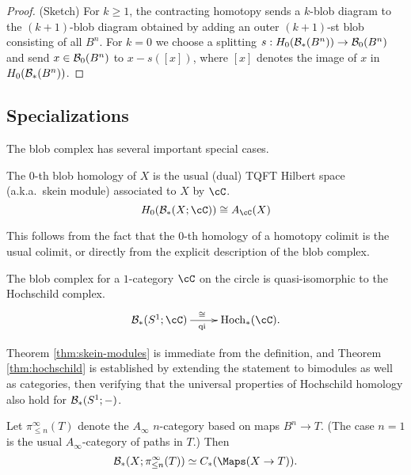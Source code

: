 \documentclass{pnastwo}
\begin{document}
\begin{article}
\begin{proof}(Sketch)
For $k\ge 1$, the contracting homotopy sends a $k$-blob diagram to the $(k{+}1)$-blob diagram
obtained by adding an outer $(k{+}1)$-st blob consisting of all $B^n$.
For $k=0$ we choose a splitting $s: H_0({\mathcal B}_*(B^n)) \to {\mathcal B}_0(B^n)$ and send 
$x\in {\mathcal B}_0(B^n)$ to $x - s([x])$, where $[x]$ denotes the image of $x$ in $H_0({\mathcal B}_*(B^n))$.
\end{proof}

\subsection{Specializations}
\label{sec:specializations}

The blob complex has several important special cases.

\begin{thm}
\label{thm:skein-modules}
The $0$-th blob homology of $X$ is the usual 
(dual) TQFT Hilbert space (a.k.a.\ skein module) associated to $X$
by $\cC$.
\begin{equation*}
H_0(\bc_*(X;\cC)) \iso A_{\cC}(X)
\end{equation*}
\end{thm}
This follows from the fact that the $0$-th homology of a homotopy colimit is the usual colimit, or directly from the explicit description of the blob complex.

\begin{thm}[Hochschild homology when $X=S^1$]
\label{thm:hochschild}
The blob complex for a $1$-category $\cC$ on the circle is
quasi-isomorphic to the Hochschild complex.
\begin{equation*}
\xymatrix{\bc_*(S^1;\cC) \ar[r]^(0.47){\iso}_(0.47){\text{qi}} & \HC_*(\cC).}
\end{equation*}
\end{thm}

Theorem \ref{thm:skein-modules} is immediate from the definition, and
Theorem \ref{thm:hochschild} is established by extending the statement to bimodules as well as categories, then verifying that the universal properties of Hochschild homology also hold for ${\mathcal B}_*(S^1; -)$.


\begin{thm}
\label{thm:map-recon}
Let $\pi^\infty_{\le n}(T)$ denote the $A_\infty$ $n$-category based on maps 
$B^n \to T$.
(The case $n=1$ is the usual $A_\infty$-category of paths in $T$.)
Then 
$$\bc_*(X; \pi^\infty_{\le n}(T)) \simeq \CM{X}{T}.$$
\end{thm}


\end{article}
\end{document}

